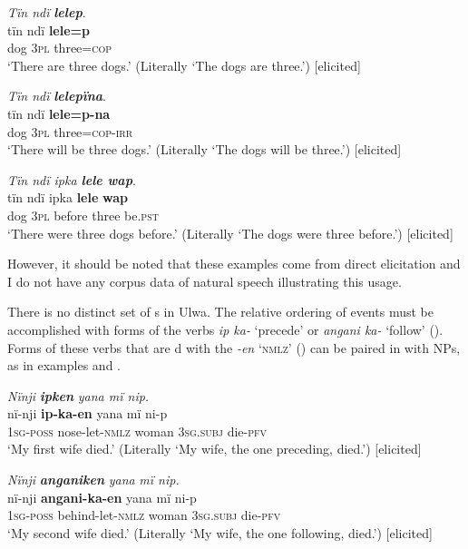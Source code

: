 \ea%
    \label{ex:det:231}
          \textit{Tïn ndï} \textbf{\textit{lelep}}.\\
\gll tïn    ndï  \textbf{lele=p}\\
    dog  3\textsc{pl}  three=\textsc{cop}\\
\glt `There are three dogs.’ (Literally ‘The dogs are three.’) [elicited]
\z

\ea%
    \label{ex:det:232}
          \textit{Tïn ndï} \textbf{\textit{lelepïna}}.\\
\gll tïn    ndï  \textbf{lele=p-na}\\
    dog  3\textsc{pl}  three=\textsc{cop}{}-\textsc{irr}\\
\glt `There will be three dogs.’ (Literally ‘The dogs will be three.’) [elicited]
\z

\newpage

\ea%
    \label{ex:det:233}
          \textit{Tïn ndï ipka \textbf{lele wap}}.\\
\gll tïn    ndï  ipka  \textbf{lele}    \textbf{wap}\\
    dog  3\textsc{pl}  before  three  be\textsc{.pst}\\
\glt `There were three dogs before.’ (Literally ‘The dogs were three before.’) [elicited]
\z

However, it should be noted that these examples come from direct elicitation and I do not have any corpus data of natural speech illustrating this usage.

  There is no distinct set of s in Ulwa. The relative ordering of events must be accomplished with forms of the verbs \textit{ip ka-} ‘precede’ or \textit{angani ka-} ‘follow’ (). Forms of these verbs that are d with the  \textit{-en} ‘\textsc{nmlz}’ () can be paired in  with NPs, as in examples  and .

\ea%
    \label{ex:det:234}
          \textit{Nïnji} \textbf{\textit{ipken}} \textit{yana mï nip.}\\
\gll nï-nji    \textbf{ip-ka-en}    yana    mï      ni-p\\
    \textsc{1sg-poss}  nose-let-\textsc{nmlz}  woman    3\textsc{sg.subj}  die-\textsc{pfv}\\
\glt `My first wife died.’ (Literally ‘My wife, the one preceding, died.’) [elicited]
\z

\ea%
    \label{ex:det:235}
          \textit{Nïnji} \textbf{\textit{anganiken}} \textit{yana}\textbf{ }\textit{mï nip.}\\
\gll    nï-nji    \textbf{angani-ka-en}    yana    mï      ni-p\\
    \textsc{1sg-poss}  behind-let-\textsc{nmlz}  woman    3\textsc{sg.subj}  die-\textsc{pfv}\\
\glt `My second wife died.’ (Literally ‘My wife, the one following, died.’) [elicited]
\z

